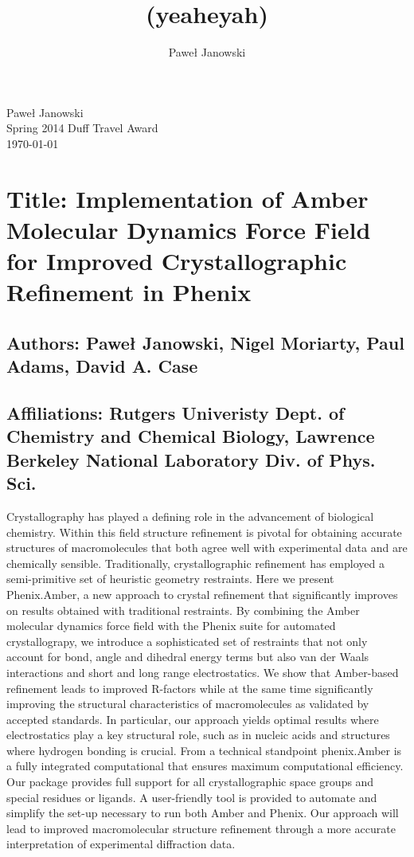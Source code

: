 \documentclass[11pt,letterpaper]{article}
\title{(yeaheyah)}
\author{Pawe\l{} Janowski}
\begin{document}
    \begin{flushright}
    \parskip 0pt
    Pawe\l{} Janowski\\
    Spring 2014 Duff Travel Award\\
    \today
    \vspace{10 mm}
    \end{flushright}
    
    



\section*{Title: Implementation of Amber Molecular Dynamics Force Field for Improved Crystallographic Refinement in Phenix}
\subsection*{Authors: Pawe\l{} Janowski, Nigel Moriarty, Paul Adams, David A. Case }
\subsection*{Affiliations: Rutgers Univeristy Dept. of Chemistry and Chemical Biology, Lawrence Berkeley National Laboratory Div. of Phys. Sci.}

Crystallography has played a defining role in the advancement of biological chemistry. Within this field structure refinement is pivotal for obtaining accurate structures of macromolecules that both agree well with experimental data and are chemically sensible. Traditionally, crystallographic refinement has employed a semi-primitive set of heuristic geometry restraints. Here we present Phenix.Amber, a new approach to crystal refinement that significantly improves on results obtained with traditional restraints. By combining the Amber molecular dynamics force field with the Phenix suite for automated crystallograpy, we introduce a sophisticated set of restraints that not only account for bond, angle and dihedral energy terms but also van der Waals interactions and short and long range electrostatics. We show that Amber-based refinement leads to improved R-factors while at the same time significantly improving the structural characteristics of macromolecules as validated by accepted standards. In particular, our approach yields optimal results where electrostatics play a key structural role, such as in nucleic acids and structures where hydrogen bonding is crucial. From a technical standpoint phenix.Amber is a fully integrated computational that  ensures maximum computational efficiency. Our package provides full support for all crystallographic space groups and special residues or ligands. A user-friendly tool is provided to automate and simplify the set-up necessary to run both Amber and Phenix. Our approach will lead to improved macromolecular structure refinement through a more accurate interpretation of experimental diffraction data. 
\end{document}
